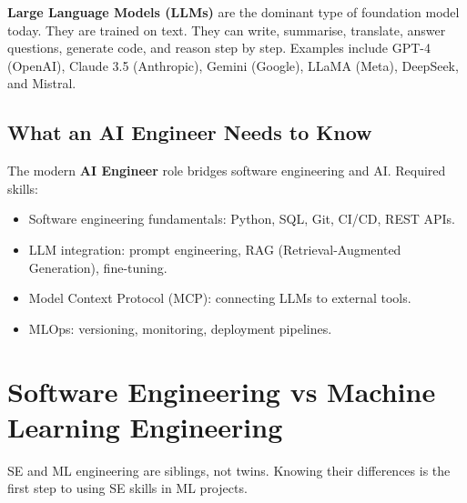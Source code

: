 \documentclass[a4paper,11pt]{article}
\newcommand{\vocab}[1]{\textbf{\color{navy}#1}}
\begin{document}
\vocab{Large Language Models (LLMs)} are the dominant type of foundation model today. They are trained on text. They can write, summarise, translate, answer questions, generate code, and reason step by step. Examples include GPT-4 (OpenAI), Claude 3.5 (Anthropic), Gemini (Google), LLaMA (Meta), DeepSeek, and Mistral.

\subsection{What an AI Engineer Needs to Know}

The modern \vocab{AI Engineer} role bridges software engineering and AI. Required skills:
\begin{itemize}
  \item Software engineering fundamentals: Python, SQL, Git, CI/CD, REST APIs.
  \item LLM integration: prompt engineering, RAG (Retrieval-Augmented Generation), fine-tuning.
  \item Model Context Protocol (MCP): connecting LLMs to external tools.
  \item MLOps: versioning, monitoring, deployment pipelines.
\end{itemize}

\section{Software Engineering vs Machine Learning Engineering}

SE and ML engineering are siblings, not twins. Knowing their differences is the first step to using SE skills in ML projects.

\begin{center}
\end{center}
\end{document}
